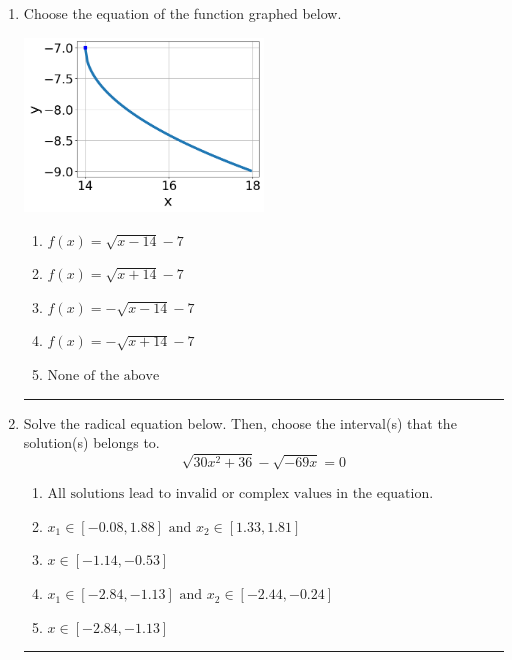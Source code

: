 \documentclass[14pt]{extbook}
\newcommand{\litem}[1]{\item#1\hspace*{-1cm}\rule{\textwidth}{0.4pt}}
\begin{document}
\begin{enumerate}
{\begin{enumerate}[label=\Alph*.]
\end{enumerate} }
\litem{
Choose the equation of the function graphed below.
\begin{center}
    \includegraphics[width=0.5\textwidth]{../Figures/radicalGraphToEquationCopyB.png}
\end{center}
\begin{enumerate}[label=\Alph*.]
\item \( f(x) = \sqrt{x - 14} - 7 \)
\item \( f(x) = \sqrt{x + 14} - 7 \)
\item \( f(x) = - \sqrt{x - 14} - 7 \)
\item \( f(x) = - \sqrt{x + 14} - 7 \)
\item \( \text{None of the above} \)

\end{enumerate} }
\litem{
Solve the radical equation below. Then, choose the interval(s) that the solution(s) belongs to.\[ \sqrt{30 x^2 + 36} - \sqrt{-69 x} = 0 \]\begin{enumerate}[label=\Alph*.]
\item \( \text{All solutions lead to invalid or complex values in the equation.} \)
\item \( x_1 \in [-0.08, 1.88] \text{ and } x_2 \in [1.33,1.81] \)
\item \( x \in [-1.14,-0.53] \)
\item \( x_1 \in [-2.84, -1.13] \text{ and } x_2 \in [-2.44,-0.24] \)
\item \( x \in [-2.84,-1.13] \)

\end{enumerate} }
\end{enumerate}
\end{document}

